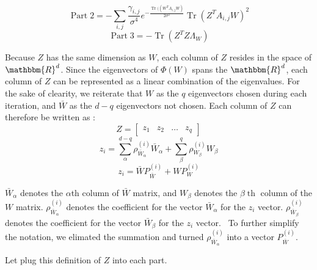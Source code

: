 \documentclass{article}
\newcommand{\nobracket}{}
\newcommand{\tmop}[1]{\ensuremath{\operatorname{#1}}}
\begin{document}
\[ \tmop{Part} 2 = - \sum_{i, j} \frac{\gamma_{i, j}}{\sigma^4} e^{-
   \frac{\tmop{Tr} ( ( W^T A_{i, j} W \nobracket)}{2 \sigma^2}} \tmop{Tr} (
   Z^T A_{i, j} W)^2 \]
\[ \tmop{Part} 3 = - \tmop{Tr} ( Z^T Z \Lambda_W) \]




Because $Z$ has the same dimension as $W$, each column of $Z$ resides in the
space of $\mathbbm{R}^d$. Since the eigenvectors of $\Phi ( W)$ spans the
$\mathbbm{R}^d$, each column of $Z$ can be represented as a linear combination
of the eigenvalues. For the sake of clearity, we reiterate that $W$ as the $q$
eigenvectors chosen during each iteration, and $\bar{W}$ as the $d - q$
eigenvectors not chosen. Each column of $Z$ can therefore be written as :
\[ Z = \left[ \begin{array}{llll}
     z_1 & z_2 & \ldots & z_q
   \end{array} \right] \]
\[ z_i = \sum_{\alpha}^{d - q} \rho^{( i)}_{\bar{W}_{\alpha}} 
   \bar{W}_{\alpha} + \sum_{\beta}^q \rho^{( i)}_{W_{\beta}} W_{\beta} \]
\[ z_i = \bar{W} P_{\bar{W}}^{( i)} + W P_W^{( i)} \]


$\bar{W}_{\alpha}$ denotes the $\alpha$th column of $\bar{W}$ matrix, and
$W_{\beta}$ denotes the $\beta \tmop{th}$ column of the $W$ matrix. $\rho^{(
i)}_{\bar{W}_{\alpha}}$ denotes the coefficient for the vector
$\bar{W}_{\alpha}$ for the $z_i$ vector. $\rho^{( i)}_{\bar{W}_{\beta}}$
denotes the coefficient for the vector $\bar{W}_{\beta}$ for the $z_i$ vector.
\ To further simplify the notation, we elimated the summation and turned
$\rho^{( i)}_{\bar{W}_{\alpha}}$ into a vector $P_{\bar{W}}^{( i)}$.





Let plug this definition of $Z$ into each part.
\end{document}
